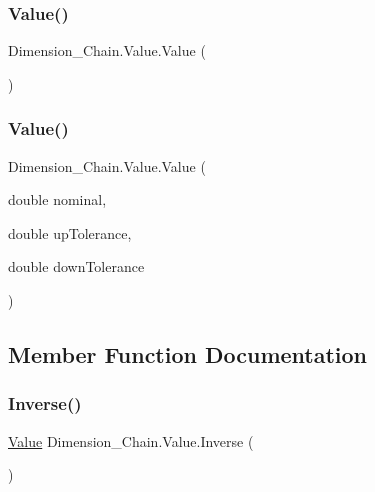 \subsubsection{\texorpdfstring{Value()}{Value()}\hspace{0.1cm}{\footnotesize\ttfamily [1/2]}}
{\footnotesize\ttfamily Dimension\+\_\+\+Chain.\+Value.\+Value (\begin{DoxyParamCaption}{ }\end{DoxyParamCaption})}

\mbox{\label{class_dimension___chain_1_1_value_adbce27eeb02d593d6baba31ef988f7a8}} 
\subsubsection{\texorpdfstring{Value()}{Value()}\hspace{0.1cm}{\footnotesize\ttfamily [2/2]}}
{\footnotesize\ttfamily Dimension\+\_\+\+Chain.\+Value.\+Value (\begin{DoxyParamCaption}\item[{double}]{nominal,  }\item[{double}]{up\+Tolerance,  }\item[{double}]{down\+Tolerance }\end{DoxyParamCaption})}



\subsection{Member Function Documentation}
\mbox{\label{class_dimension___chain_1_1_value_a85d60135a70b5e670bf0a1e1cc0967da}} 
\subsubsection{\texorpdfstring{Inverse()}{Inverse()}}
{\footnotesize\ttfamily \mbox{\hyperlink{class_dimension___chain_1_1_value}{Value}} Dimension\+\_\+\+Chain.\+Value.\+Inverse (\begin{DoxyParamCaption}{ }\end{DoxyParamCaption})}



